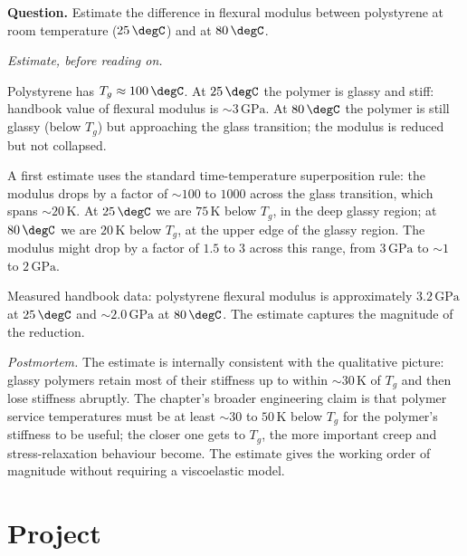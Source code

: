 \begin{estimation}
\textbf{Question.} Estimate the difference in flexural modulus between
polystyrene at room temperature ($25\,\degC$) and at $80\,\degC$.

\smallskip
\textit{Estimate, before reading on.}

\smallskip
Polystyrene has $T_g \approx 100\,\degC$. At $25\,\degC$ the polymer
is glassy and stiff: handbook value of flexural modulus is $\sim 3\,
\text{GPa}$. At $80\,\degC$ the polymer is still glassy (below $T_g$)
but approaching the glass transition; the modulus is reduced but not
collapsed.

A first estimate uses the standard time-temperature superposition rule:
the modulus drops by a factor of $\sim 100$ to $1000$ across the
glass transition, which spans $\sim 20\,\si{\kelvin}$. At $25\,\degC$
we are $75\,\si{\kelvin}$ below $T_g$, in the deep glassy region; at
$80\,\degC$ we are $20\,\si{\kelvin}$ below $T_g$, at the upper edge
of the glassy region. The modulus might drop by a factor of $1.5$ to
$3$ across this range, from $3\,\text{GPa}$ to $\sim 1$ to $2\,
\text{GPa}$.

Measured handbook data: polystyrene flexural modulus is approximately
$3.2\,\text{GPa}$ at $25\,\degC$ and $\sim 2.0\,\text{GPa}$ at
$80\,\degC$. The estimate captures the magnitude of the reduction.

\smallskip
\textit{Postmortem.} The estimate is internally consistent with the
qualitative picture: glassy polymers retain most of their stiffness up
to within $\sim 30\,\si{\kelvin}$ of $T_g$ and then lose stiffness
abruptly. The chapter's broader engineering claim is that polymer
service temperatures must be at least $\sim 30$ to $50\,\si{\kelvin}$
below $T_g$ for the polymer's stiffness to be useful; the closer one
gets to $T_g$, the more important creep and stress-relaxation
behaviour become. The estimate gives the working order of magnitude
without requiring a viscoelastic model.
\end{estimation}

\section{Project}

